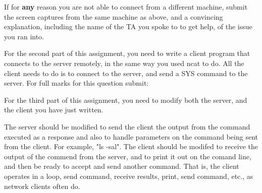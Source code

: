 \documentclass[9pt, addpoints]{exam}
\begin{document}
\begin{questions}
\begin{parts}
     If for \textbf{any} reason you are not able to connect from a different machine,
     submit the screen captures from the same machine as above, and a convincing explanation,
     including the name of the TA you spoke to to get help, of the issue you ran into.
 \end{parts}

\newpage

    \question
     For the second part of this assignment, you need to write a client
     program that connects to the server remotely, in the same way you used
     ncat to do. All the client needs to do is to connect to the server, 
     and send a SYS command to the server. For full marks for this question
     submit:



 \question
      For the third part of this assignment, you need to modify both the server,
      and the client you have just written. 

      The server should be modified to send the client the output from the command
      executed as a response and also to handle parameters on the command being sent
      from the client. For example, "ls -sal". The client should be modifed to receive the output of
      the commend from the server,
      and to print it out on the comand line, and then be ready to accept and send
      another command. That is, the client operates in a loop, send command, receive
      results, print, send command, etc., as network clients often do.

\end{questions}
\end{document}
